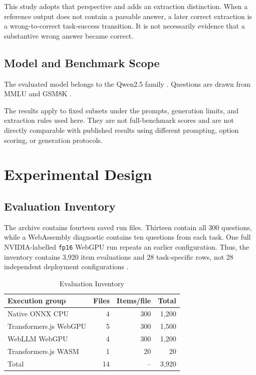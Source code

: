 \documentclass[conference]{IEEEtran}
\newcommand{\fphalf}{\texttt{fp16}}
\begin{document}
This study adopts that perspective and adds an extraction
distinction. When a reference output does not contain a
parsable answer, a later correct extraction is a
wrong-to-correct task-success transition. It is not
necessarily evidence that a substantive wrong answer became
correct.


\subsection{Model and Benchmark Scope}

The evaluated model belongs to the Qwen2.5 family
\cite{qwen}. Questions are drawn from MMLU \cite{mmlu}
and GSM8K \cite{gsm8k}.

The results apply to fixed subsets under the prompts,
generation limits, and extraction rules used here.
They are not full-benchmark scores and are not directly
comparable with published results using different prompting,
option scoring, or generation protocols.


\section{Experimental Design}
\label{sec:design}

\subsection{Evaluation Inventory}

The archive contains fourteen saved run files. Thirteen
contain all 300 questions, while a WebAssembly diagnostic
contains ten questions from each task. One full
NVIDIA-labelled \fphalf{} WebGPU run repeats an earlier
configuration. Thus, the inventory contains 3,920 item
evaluations and 28 task-specific rows, not 28 independent
deployment configurations \cite{archive,repository}.

\begin{table}[t]
\caption{Evaluation Inventory}
\label{tab:inventory}
\centering
\footnotesize
\setlength{\tabcolsep}{5pt}
\begin{tabular}{@{}lrrr@{}}
\toprule
Execution group & Files & Items/file & Total\\
\midrule
Native ONNX CPU & 4 & 300 & 1,200\\
Transformers.js WebGPU & 5 & 300 & 1,500\\
WebLLM WebGPU & 4 & 300 & 1,200\\
Transformers.js WASM & 1 & 20 & 20\\
\midrule
Total & 14 & -- & 3,920\\
\bottomrule
\end{tabular}
\end{table}
\end{document}
